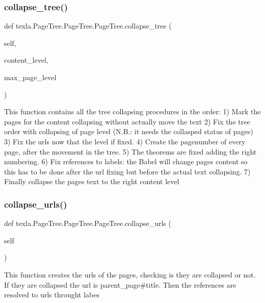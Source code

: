 \subsubsection{\texorpdfstring{collapse\+\_\+tree()}{collapse\_tree()}}
{\footnotesize\ttfamily def texla.\+Page\+Tree.\+Page\+Tree.\+Page\+Tree.\+collapse\+\_\+tree (\begin{DoxyParamCaption}\item[{}]{self,  }\item[{}]{content\+\_\+level,  }\item[{}]{max\+\_\+page\+\_\+level }\end{DoxyParamCaption})}

\begin{DoxyVerb}This function contains all the tree collapsing
procedures in the order:
1) Mark the pages for the content collapsing without
   actually move the text
2) Fix the tree order with collapsing of page level
   (N.B.: it needs the collasped status of pages)
3) Fix the urls now that the level if fixed.
4) Create the pagenumber of every page, after the
   movement in the tree.
5) The theorems are fixed adding the right numbering.
6) Fix references to labels: the Babel will change pages
   content so this has to be done after the url fixing
   but before the actual text collapsing.
7) Finally collapse the pages text to the
   right content level\end{DoxyVerb}
 \hypertarget{classtexla_1_1PageTree_1_1PageTree_1_1PageTree_a5f9436e36fa9fdd44f5e219cec82c672}{}\label{classtexla_1_1PageTree_1_1PageTree_1_1PageTree_a5f9436e36fa9fdd44f5e219cec82c672} 
\subsubsection{\texorpdfstring{collapse\+\_\+urls()}{collapse\_urls()}}
{\footnotesize\ttfamily def texla.\+Page\+Tree.\+Page\+Tree.\+Page\+Tree.\+collapse\+\_\+urls (\begin{DoxyParamCaption}\item[{}]{self }\end{DoxyParamCaption})}

\begin{DoxyVerb}This function creates the urls of the pages,
checking is they are collapsed or not. If they are collapsed
the url is parent_page#title.
Then the references are resolved to urls throught labes\end{DoxyVerb}
 \hypertarget{classtexla_1_1PageTree_1_1PageTree_1_1PageTree_a35dca3874408cd36aa781ed52d471336}{}\label{classtexla_1_1PageTree_1_1PageTree_1_1PageTree_a35dca3874408cd36aa781ed52d471336} 
